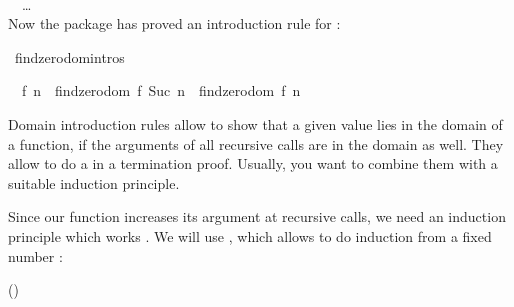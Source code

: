 \begin{isabellebody}
\begin{isamarkuptext}
\vspace{1ex}
\noindent{} \\%
\isanewline%
\ \ \ldots\\

  \noindent Now the package has proved an introduction rule for :%
\end{isamarkuptext}%
\isamarkuptrue%
\isamarkupfalse%
\ findzero{\isachardot}domintros%
\begin{isamarkuptext}%
\begin{isabelle}%
{\isacharparenleft}{}\ {\isacharless}\ {\isacharquery}f\ {\isacharquery}n\ {\isasymLongrightarrow}\ findzero{\isacharunderscore}dom\ {\isacharparenleft}{\isacharquery}f{\isacharcomma}\ Suc\ {\isacharquery}n{\isacharparenright}{\isacharparenright}\ {\isasymLongrightarrow}\ findzero{\isacharunderscore}dom\ {\isacharparenleft}{\isacharquery}f{\isacharcomma}\ {\isacharquery}n{\isacharparenright}%
\end{isabelle}

  Domain introduction rules allow to show that a given value lies in the
  domain of a function, if the arguments of all recursive calls
  are in the domain as well. They allow to do a  in a
  termination proof. Usually, you want to combine them with a suitable
  induction principle.

  Since our function increases its argument at recursive calls, we
  need an induction principle which works . We will use
  , which allows to do induction from a fixed number
  :

  \begin{center}\hfill()\end{center}


\end{isamarkuptext}
\end{isabellebody}
